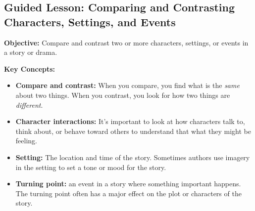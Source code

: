 \documentclass[12pt]{article}
\title{}
\date{}
\begin{document}
\subsection*{Guided Lesson: Comparing and Contrasting Characters, Settings, and Events}
\onehalfspacing

\begin{tcolorbox}[colframe=black!40, colback=gray!5, 
coltitle=black, colbacktitle=black!20, fonttitle=\bfseries\Large, 
title=Learning Objective, halign title=center, left=5pt, right=5pt, top=5pt, bottom=15pt]
\textbf{Objective:} Compare and contrast two or more characters, settings, or events in a story or drama.
\end{tcolorbox}

\vspace{1em}

\begin{tcolorbox}[colframe=black!60, colback=white, 
coltitle=black, colbacktitle=black!15, fonttitle=\bfseries\Large, 
title=Key Concepts and Vocabulary, halign title=center, left=10pt, right=10pt, top=10pt, bottom=15pt]
\textbf{Key Concepts:}
\begin{itemize}
    \item \textbf{Compare and contrast:} When you compare, you find what is the \textit{same} about two things. When you contrast, you look for how two things are \textit{different}.
    \item \textbf{Character interactions:} It's important to look at how characters talk to, think about, or behave toward others to understand that what they might be feeling. 
    \item \textbf{Setting:} The location and time of the story. Sometimes authors use imagery in the setting to set a tone or mood for the story.

    \item \textbf{Turning point:} an event in a story where something important happens. The turning point often has a major effect on the plot or characters of the story.
\end{itemize}
\end{tcolorbox}

\vspace{1em}
\end{document}
